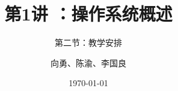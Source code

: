 


\title[第1讲]{第1讲 ：操作系统概述} %
\subtitle{第二节：教学安排}
\author{向勇、陈渝、李国良} %
\date{\today} %



\begin{frame}
\titlepage %
\end{frame}


